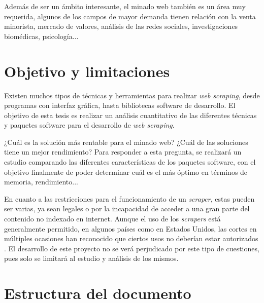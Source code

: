 Además de ser un ámbito interesante, el minado web también es un área muy requerida, algunos de los campos
de mayor demanda tienen relación con la venta minorista, mercado de valores, análisis de las redes sociales,
investigaciones biomédicas, psicología...

\section{Objetivo y limitaciones}
\label{sec:objetivo y limitaciones}

Existen muchos tipos de técnicas y herramientas para realizar \emph{web scraping}, desde programas con 
interfaz gráfica, hasta bibliotecas software de desarrollo. El objetivo de esta tesis es realizar un análisis
cuantitativo de las diferentes técnicas y paquetes software para el desarrollo de \emph{web scraping}.

¿Cuál es la solución más rentable para el minado web? ¿Cuál de las soluciones tiene un mejor rendimiento?
Para responder a esta pregunta, se realizará un estudio comparando las diferentes características de los
paquetes software, con el objetivo finalmente de poder determinar cuál es el más óptimo en términos de
memoria, rendimiento...

En cuanto a las restricciones para el funcionamiento de un \emph{scraper}, estas pueden ser varias, ya sean 
legales o por la incapacidad de acceder a una gran parte del contenido no indexado en internet. Aunque el 
uso de los \emph{scrapers} está generalmente permitido, en algunos países como en Estados Unidos, las 
cortes en múltiples ocasiones han reconocido que ciertos usos no deberían estar autorizados 
\cite{Andreas-Mehlfuhrer}. El desarrollo de este proyecto no se verá perjudicado por este tipo de 
cuestiones, pues solo se limitará al estudio y análisis de los mismos.

\section{Estructura del documento}
\label{sec:estructura del documento}

